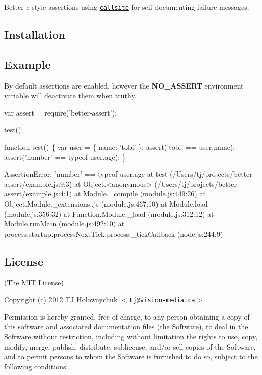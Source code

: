 Better c-\/style assertions using \href{https://github.com/visionmedia/callsite}{\tt callsite} for self-\/documenting failure messages.

\subsection*{Installation}



\subsection*{Example}

By default assertions are enabled, however the {\bfseries N\+O\+\_\+\+A\+S\+S\+E\+RT} environment variable will deactivate them when truthy.


\begin{DoxyCode}
var assert = require('better-assert');

test();

function test() \{
  var user = \{ name: 'tobi' \};
  assert('tobi' == user.name);
  assert('number' == typeof user.age);
\}

AssertionError: 'number' == typeof user.age
    at test (/Users/tj/projects/better-assert/example.js:9:3)
    at Object.<anonymous> (/Users/tj/projects/better-assert/example.js:4:1)
    at Module.\_compile (module.js:449:26)
    at Object.Module.\_extensions..js (module.js:467:10)
    at Module.load (module.js:356:32)
    at Function.Module.\_load (module.js:312:12)
    at Module.runMain (module.js:492:10)
    at process.startup.processNextTick.process.\_tickCallback (node.js:244:9)
\end{DoxyCode}


\subsection*{License}

(The M\+IT License)

Copyright (c) 2012 TJ Holowaychuk $<$\href{mailto:tj@vision-media.ca}{\tt tj@vision-\/media.\+ca}$>$

Permission is hereby granted, free of charge, to any person obtaining a copy of this software and associated documentation files (the \textquotesingle{}Software\textquotesingle{}), to deal in the Software without restriction, including without limitation the rights to use, copy, modify, merge, publish, distribute, sublicense, and/or sell copies of the Software, and to permit persons to whom the Software is furnished to do so, subject to the following conditions\+:

